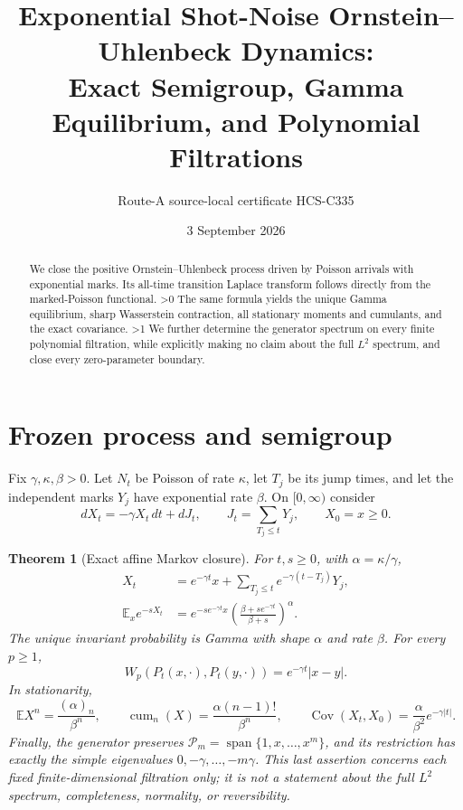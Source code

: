 \documentclass[10pt]{article}
\title{Exponential Shot-Noise Ornstein--Uhlenbeck Dynamics:\\Exact Semigroup, Gamma Equilibrium, and Polynomial Filtrations}
\author{Route-A source-local certificate HCS-C335}
\date{3 September 2026}
\providecommand{\CRevisionRound}{2}
\newtheorem{theorem}{Theorem}
\newcommand{\E}{\mathbb E}
\newcommand{\Pp}{\mathcal P}
\begin{document}
\maketitle
\begin{abstract}
We close the positive Ornstein--Uhlenbeck process driven by Poisson arrivals
with exponential marks.  Its all-time transition Laplace transform follows
directly from the marked-Poisson functional.
\ifnum\CRevisionRound>0
The same formula yields the unique Gamma equilibrium, sharp Wasserstein
contraction, all stationary moments and cumulants, and the exact covariance.
\fi
\ifnum\CRevisionRound>1
We further determine the generator spectrum on every finite polynomial
filtration, while explicitly making no claim about the full $L^2$ spectrum,
and close every zero-parameter boundary.
\fi
\end{abstract}

\section{Frozen process and semigroup}
Fix $\gamma,\kappa,\beta>0$.  Let $N_t$ be Poisson of rate $\kappa$, let
$T_j$ be its jump times, and let the independent marks $Y_j$ have
exponential rate $\beta$.  On $[0,\infty)$ consider
\begin{equation}\label{eq:sde}
 dX_t=-\gamma X_t\,dt+dJ_t,
 \qquad J_t=\sum_{T_j\leq t}Y_j,
 \qquad X_0=x\geq0.
\end{equation}

\begin{theorem}[Exact affine Markov closure]\label{thm:main}
For $t,s\geq0$, with $\alpha=\kappa/\gamma$,
\begin{align}
 X_t&=e^{-\gamma t}x+
 \sum_{T_j\leq t}e^{-\gamma(t-T_j)}Y_j,\label{eq:path}\\
 \E_xe^{-sX_t}&=e^{-se^{-\gamma t}x}
 \left(\frac{\beta+se^{-\gamma t}}{\beta+s}\right)^\alpha.
 \label{eq:LT}
\end{align}
The unique invariant probability is Gamma with shape $\alpha$ and rate
$\beta$.  For every $p\geq1$,
\begin{equation}\label{eq:Wp}
 W_p(P_t(x,\cdot),P_t(y,\cdot))=e^{-\gamma t}|x-y|.
\end{equation}
In stationarity,
\begin{equation}\label{eq:statistics}
 \E X^n=\frac{(\alpha)_n}{\beta^n},\qquad
 \operatorname{cum}_n(X)=\frac{\alpha(n-1)!}{\beta^n},\qquad
 \operatorname{Cov}(X_t,X_0)=\frac{\alpha}{\beta^2}e^{-\gamma|t|}.
\end{equation}
Finally, the generator preserves
$\Pp_m=\operatorname{span}\{1,x,\ldots,x^m\}$, and its restriction has
exactly the simple eigenvalues $0,-\gamma,\ldots,-m\gamma$.
This last assertion concerns each fixed finite-dimensional filtration only;
it is not a statement about the full $L^2$ spectrum, completeness,
normality, or reversibility.
\end{theorem}
\end{document}
